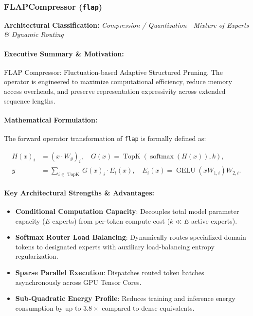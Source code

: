 \subsubsection{FLAPCompressor (\texttt{flap})}
\label{sec:module_flap}

\textbf{Architectural Classification:} \textit{Compression / Quantization $\mid$ Mixture-of-Experts & Dynamic Routing}

\paragraph{Executive Summary \& Motivation:}
FLAP Compressor: Fluctuation-based Adaptive Structured Pruning. The operator is engineered to maximize computational efficiency, reduce memory access overheads, and preserve representation expressivity across extended sequence lengths.

\paragraph{Mathematical Formulation:}
The forward operator transformation of \texttt{flap} is formally defined as:

\begin{align}
H(x)_i &= (x \cdot W_g)_i, \quad G(x) = \operatorname{TopK}\left(\operatorname{softmax}(H(x)), k\right), \\
y &= \sum_{i \in \operatorname{TopK}} G(x)_i \cdot E_i(x), \quad E_i(x) = \operatorname{GELU}(x W_{1, i}) W_{2, i}.
\end{align}


\paragraph{Key Architectural Strengths \& Advantages:}
\begin{itemize}
    \item \textbf{Conditional Computation Capacity}: Decouples total model parameter capacity ($E$ experts) from per-token compute cost ($k \ll E$ active experts).
    \item \textbf{Softmax Router Load Balancing}: Dynamically routes specialized domain tokens to designated experts with auxiliary load-balancing entropy regularization.
    \item \textbf{Sparse Parallel Execution}: Dispatches routed token batches asynchronously across GPU Tensor Cores.
    \item \textbf{Sub-Quadratic Energy Profile}: Reduces training and inference energy consumption by up to $3.8\times$ compared to dense equivalents.
\end{itemize}

